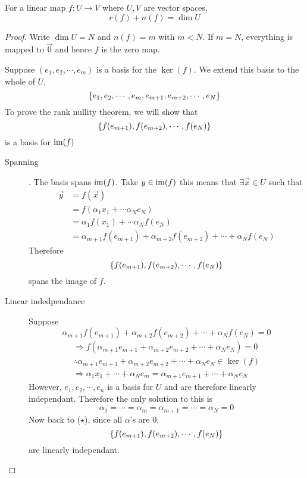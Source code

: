 \documentclass{article}
\numberwithin{equation}{section}
\begin{document}
\begin{thm}
    For a linear map $f: U \rightarrow V$ where $U, V$ are vector spaces,
    \begin{equation}\label{eq:3-9}
        r(f) + n(f) = \dim U
    \end{equation}
\end{thm}
\begin{proof}
    Write $\dim U = N$ and $n(f) = m$ with $m < N$. 
    If $m = N$, everything is mapped to $\vec 0$ and hence $f$ is the zero map.

    Suppose $(e_1, e_2, \cdots, e_m)$ is a basis for the $\ker(f)$. 
    We extend this basis to the whole of $U$, 
    \[
        \left\{ e_1, e_2, \cdots, e_m, e_{m+1}, e_{m+2}, \cdots, e_{N} \right\}  
    \]
    To prove the rank nullity theorem, we will show that
    \[
        \left\{ f(e_{m+1}), f(e_{m+2}), \cdots, f(e_{N}) \right\}
    \]
    is a basis for $\operatorname{im}(f)$
    \begin{description}
        \item[Spanning]. The basis spans $\operatorname{im}(f)$.
        Take $y \in \operatorname{im}(f)$ this means that $\exists \vec x \in U$ such that
        \begin{align*}
            \vec y &= f(\vec x) \\
            &= f(\alpha_1 x_1 + \cdots \alpha_N e_N) \\
            &= \alpha_1f(x_1) + \cdots \alpha_N f(e_N) \\
            &= \alpha_{m+1}f(e_{m+1}) + \alpha_{m+2}f(e_{m+2}) + \cdots + \alpha_Nf(e_{N})
        \end{align*}
        Therefore
        \[
            \left\{ f(e_{m+1}), f(e_{m+2}), \cdots, f(e_{N}) \right\}
        \]
        spans the image of $f$.
        \item[Linear indedpendance] Suppose
        \[
            \alpha_{m+1}f(e_{m+1}) + \alpha_{m+2}f(e_{m+2}) +\cdots + \alpha_Nf(e_{N}) = 0 \tag{$\star$}
        \]
        \begin{align*}
            \Rightarrow f(\alpha_{m+1}e_{m+1} + \alpha_{m+2}e_{m+2} + \cdots + \alpha_Ne_{N}) = 0 \\
            \therefore \alpha_{m+1}e_{m+1} + \alpha_{m+2}e_{m+2} + \cdots + \alpha_Ne_{N} \in \ker(f) \\
            \Rightarrow \alpha_1 x_1 + \cdots + \alpha_N e_m = \alpha_{m+1}e_{m+1} + \cdots + \alpha_{N}e_{N}
        \end{align*}
        However, $e_1, e_2, \cdots, e_n$ is a basis for $U$ and are therefore linearly independant. 
        Therefore the only solution to this is
        \[
            \alpha_1 = \cdots = \alpha_m = \alpha_{m+1} = \cdots = \alpha_N = 0  
        \]
        Now back to ($\star$), since all $\alpha$'s are $0$, 
        \[
            \left\{ f(e_{m+1}), f(e_{m+2}), \cdots, f(e_{N}) \right\}    
        \]
        are linearly independant.
    \end{description}
\end{proof}
\end{document}
